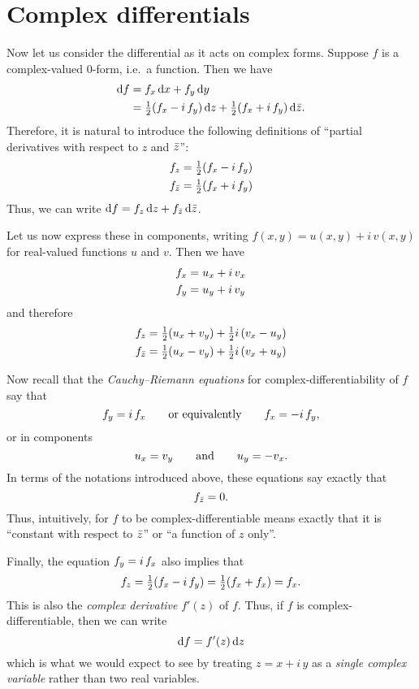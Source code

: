 \documentclass[12pt]{amsart}
\begin{document}
\section{Complex differentials}
\label{sec:complex-differentials}

Now let us consider the differential as it acts on complex forms.
Suppose $f$ is a complex-valued 0-form, i.e.\ a function.
Then we have
\begin{align*}
  {\ensuremath{\mathrm{d} f}} &= {f}_{x} \, {\mathrm{d} x} + {f}_{y}\,{\mathrm{d} y}\\
  &= \textstyle\frac{1}{2} ({f}_{x} - i\, {f}_{y})\,{\mathrm{d} z} + \textstyle\frac{1}{2} ({f}_{x} + i\, {f}_{y})\,{\mathrm{d} \bar{z}}.
\end{align*}
Therefore, it is natural to introduce the following definitions of ``partial derivatives with respect to $z$ and $\bar{z}$'':
\begin{align*}
  {f}_{z} &= \textstyle\frac{1}{2} ({f}_{x} - i\, {f}_{y})\\
  {f}_{\bar{z}} &= \textstyle\frac{1}{2} ({f}_{x} + i\, {f}_{y})
\end{align*}
Thus, we can write ${\mathrm{d} f} = {f}_{z} \,{\mathrm{d} z} + {f}_{\bar{z}} \,{\mathrm{d} \bar{z}}$.

Let us now express these in components, writing $f(x,y) = u(x,y) + i\,v(x,y)$ for real-valued functions $u$ and $v$.
Then we have
\begin{align*}
  {f}_{x} &= {u}_{x} + i\, {v}_{x}\\
  {f}_{y} &= {u}_{y} + i\, {v}_{y}
\end{align*}
and therefore
\begin{align*}
  {f}_{z} &= \textstyle\frac{1}{2} ({u}_{x} + {v}_{y}) + \textstyle\frac{1}{2} i\, ({v}_{x} - {u}_{y})\\
  {f}_{\bar{z}} &= \textstyle\frac{1}{2} ({u}_{x} - {v}_{y}) + \textstyle\frac{1}{2} i\, ({v}_{x} + {u}_{y})\\
\end{align*}

Now recall that the \emph{Cauchy--Riemann equations} for complex-differentiability of $f$ say that
\[ {f}_{y} = i\,{f}_{x} \qquad\text{or equivalently}\qquad {f}_{x} = - i\,{f}_{y},\]
or in components
\[ {u}_{x} = {v}_{y} \qquad\text{and}\qquad {u}_{y} = - {v}_{x}. \]
In terms of the notations introduced above, these equations say exactly that
\[ {f}_{\bar{z}} = 0. \]
Thus, intuitively, for $f$ to be complex-differentiable means exactly that it is ``constant with respect to $\bar{z}$'' or ``a function of $z$ only''.

Finally, the equation ${f}_{y} = i\,{f}_{x}$ also implies that
\[ {f}_{z} = \textstyle\frac{1}{2}({f}_{x} - i\,{f}_{y}) = \textstyle\frac{1}{2} ({f}_{x} + {f}_{x}) = {f}_{x}.\]
This is also the \emph{complex derivative} $f'(z)$ of $f$.
Thus, if $f$ is complex-differentiable, then we can write
\[ {\mathrm{d} f} = f'(z) \,{\mathrm{d} z} \]
which is what we would expect to see by treating $z = x+i\,y$ as a \emph{single complex variable} rather than two real variables.
\end{document}
